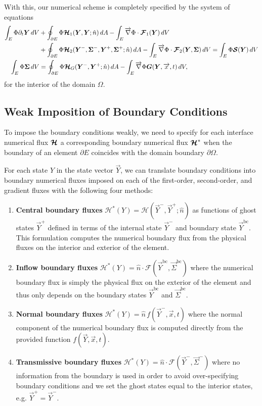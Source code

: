 \documentclass{report}
\numberwithin{equation}{section}
\begin{document}
With this, our numerical scheme is completely specified by the system of equations 
\begin{align}
    \int_E \Phi \partial_t \boldsymbol{{Y}} \, dV 
    & + \oint_{\partial E} \Phi \boldsymbol{{\mathcal{H}}}_1 (\boldsymbol{{Y}}, \boldsymbol{{Y}}; \hat n) \, dA 
    - \int_E \overrightarrow{\nabla} \Phi \cdot \boldsymbol{{\mathcal{F}}}_1(\boldsymbol{{Y}}) \, dV  \label{eq:weak_form} \\
    & + \oint_{\partial E} \Phi \boldsymbol{{\mathcal{H}}}_2 (\boldsymbol{{Y}}^-, \boldsymbol{{\Sigma}}^-, \boldsymbol{{Y}}^+, \boldsymbol{{\Sigma}}^+; \hat n) \, dA
    - \int_E \overrightarrow{\nabla} \Phi \cdot \boldsymbol{{\mathcal{F}}}_2(\boldsymbol{{Y}}, \boldsymbol{{\Sigma}}) \, dV
    = \int_E \Phi \boldsymbol{{\mathcal{S}}}(\boldsymbol{{Y}}) \, dV \nonumber \\
    \int_E \Phi \boldsymbol{{\Sigma}} \, dV
    & = \oint_{\partial E} \Phi \boldsymbol{{\mathcal{H}}}_G (\boldsymbol{{Y}}^-, \boldsymbol{{Y}}^+; \hat n) \, dA
    - \int_E \overrightarrow{\nabla} \Phi \boldsymbol{{G}}(\boldsymbol{{Y}}, \overrightarrow{x}, t) \, dV,
\end{align}
for the interior of the domain $\Omega$.


\subsection{Weak Imposition of Boundary Conditions}

To impose the boundary conditions weakly, we need to specify for each interface numerical flux $\boldsymbol{{\mathcal{H}}}$ a corresponding boundary numerical flux $\boldsymbol{{\mathcal{H}}}^*$ when the boundary of an element $\partial E$ coincides with the domain boundary $\partial \Omega$. 

For each state $Y$ in the state vector $\vec Y$, we can translate boundary conditions into boundary numerical fluxes imposed on each of the first-order, second-order, and gradient fluxes with the following four methods:
\begin{enumerate}
    \item \textbf{Central boundary fluxes} $\mathcal{H}^*(Y) = \mathcal{H}(\vec Y^-, \vec Y^+; \hat n)$ as functions of ghost states $\vec Y^+$ defined in terms of the internal state $\vec Y^-$ and boundary state $\vec Y^{\text{bc}}$. This formulation computes the numerical boundary flux from the physical fluxes on the interior and exterior of the element.
    \item \textbf{Inflow boundary fluxes} $\mathcal{H}^*(Y) = \hat n \cdot \mathcal{F}(\vec Y^{\text{bc}}, \vec \Sigma^{\text{bc}})$ where the numerical boundary flux is simply the physical flux on the exterior of the element and thus only depends on the boundary states $\vec Y^{\text{bc}}$ and $\vec \Sigma^{\text{bc}}$.
    \item \textbf{Normal boundary fluxes} $\mathcal{H}^*(Y) = \hat n \, f(\vec Y^-, \overrightarrow{x}, t)$ where the normal component of the numerical boundary flux is computed directly from the provided function $f(\vec Y, \overrightarrow{x}, t)$. 
    \item \textbf{Transmissive boundary fluxes} $\mathcal{H}^*(Y) = \hat n \cdot \mathcal{F}(\vec Y^-, \vec \Sigma^-)$ where no information from the boundary is used in order to avoid over-specifying boundary conditions and we set the ghost states equal to the interior states, e.g. $\vec Y^+ = \vec Y^-$.
\end{enumerate}
\end{document}
